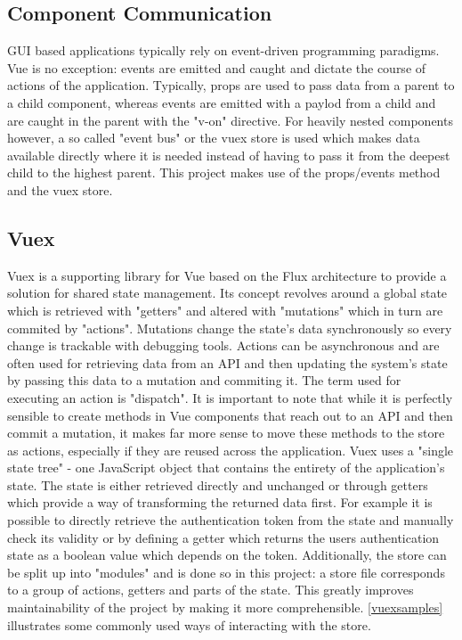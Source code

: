 \subsection{Component Communication}
GUI based applications typically rely on event-driven programming paradigms. Vue is no exception: events are emitted and caught and dictate the course of actions of the application. Typically, props are used to pass data from a parent to a child component, whereas events are emitted with a paylod from a child and are caught in the parent with the "v-on" directive. For heavily nested components however, a so called "event bus" or the vuex store is used which makes data available directly where it is needed instead of having to pass it from the deepest child to the highest parent. This project makes use of the props/events method and the vuex store.

\subsection{Vuex}
Vuex is a supporting library for Vue based on the Flux architecture to provide a solution for shared state management. Its concept revolves around a global state which is retrieved with "getters" and altered with "mutations" which in turn are commited by "actions". Mutations change the state's data synchronously so every change is trackable with debugging tools. Actions can be asynchronous and are often used for retrieving data from an API and then updating the system's state by passing this data to a mutation and commiting it. The term used for executing an action is "dispatch". It is important to note that while it is perfectly sensible to create methods in Vue components that reach out to an API and then commit a mutation, it makes far more sense to move these methods to the store as actions, especially if they are reused across the application. Vuex uses a "single state tree" - one JavaScript object that contains the entirety of the application's state. The state is either retrieved directly and unchanged or through getters which provide a way of transforming the returned data first. For example it is possible to directly retrieve the authentication token from the state and manually check its validity or by defining a getter which returns the users authentication state as a boolean value which depends on the token. Additionally, the store can be split up into "modules" and is done so in this project: a store file corresponds to a group of actions, getters and parts of the state. This greatly improves maintainability of the project by making it more comprehensible. \autoref{vuexsamples} illustrates some commonly used ways of interacting with the store. \newline

